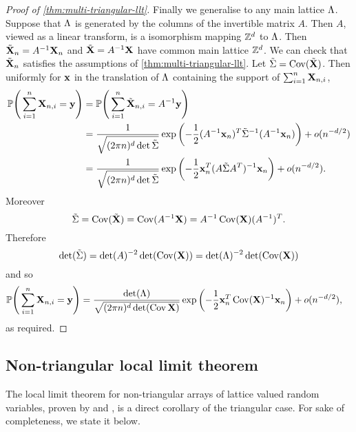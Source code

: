 \begin{proof}[Proof of \cref{thm:multi-triangular-llt}]
    Finally we generalise to any main lattice $\Lambda$. Suppose that $\Lambda$ is generated by the columns of the invertible matrix $A$. Then $A$, viewed as a linear transform, is a isomorphism mapping ${\mathbb Z}^d$ to $\Lambda$. 
    Then $\tilde{{\mathbf X}}_n = A^{-1} {\mathbf X}_n$ and $\tilde{{\mathbf X}} = A^{-1} {\mathbf X}$ have common main lattice ${\mathbb Z}^d$. We can check that $\tilde{{\mathbf X}}_n$ satisfies the assumptions of \cref{thm:multi-triangular-llt}. Let $\tilde{\Sigma} = \operatorname{Cov}(\tilde{{\mathbf X}})$. Then uniformly for ${\mathbf x}$ in the translation of $\Lambda$ containing the support of $\sum_{i=1}^n {\mathbf X}_{n, i}$,
    \begin{align*}
        {\mathbb P}\Bigg(\sum_{i=1}^n {\mathbf X}_{n, i} = {\mathbf y}\Bigg)
        &= {\mathbb P}\Bigg(\sum_{i=1}^n \tilde{{\mathbf X}}_{n, i} = A^{-1}{\mathbf y}\Bigg) \\
        &= \frac{1}{\sqrt{(2 \pi n)^{d} \det\tilde{\Sigma}}} \exp \left( 
            -\frac{1}{2} (A^{-1} {\mathbf x}_n)^T \tilde{\Sigma}^{-1} (A^{-1} {\mathbf x}_n) 
         \right) + o(n^{-d/2}) \\
        &= \frac{1}{\sqrt{(2 \pi n)^{d} \det\tilde{\Sigma}}} \exp \left( 
            -\frac{1}{2} {\mathbf x}_n^T (A \tilde{\Sigma} A^T)^{-1} {\mathbf x}_n 
         \right) + o(n^{-d/2}).
    \end{align*}
    Moreover
    \begin{equation*}
        \tilde{\Sigma}
        = \operatorname{Cov}(\tilde{{\mathbf X}}) = \operatorname{Cov}(A^{-1} {\mathbf X})
        = A^{-1} \operatorname{Cov}({\mathbf X}) (A^{-1})^T.
    \end{equation*}
    Therefore
    \begin{equation*}
        \det(\tilde{\Sigma}) = \det(A)^{-2} \det(\operatorname{Cov}({\mathbf X})) = \det(\Lambda)^{-2} \det(\operatorname{Cov}({\mathbf X}))
    \end{equation*}
    and so
    \begin{align*}
        {\mathbb P}\Bigg(\sum_{i=1}^n {\mathbf X}_{n, i} = {\mathbf y}\Bigg)
        &= \frac{\det(\Lambda)}{\sqrt{(2 \pi n)^{d} \det(\operatorname{Cov} {\mathbf X})}} \exp \left( 
            -\frac{1}{2} {\mathbf x}_n^T \operatorname{Cov}({\mathbf X})^{-1} {\mathbf x}_n 
         \right) + o(n^{-d/2}),
    \end{align*}
    as required.
\end{proof}

\subsection{Non-triangular local limit theorem}

The local limit theorem for non-triangular arrays of lattice valued random variables, proven by \citet{rvavceva1962domains} and \citet{gamkrelidzeLocalLimitTheorem2015}, is a direct corollary of the triangular case. For sake of completeness, we state it below.

